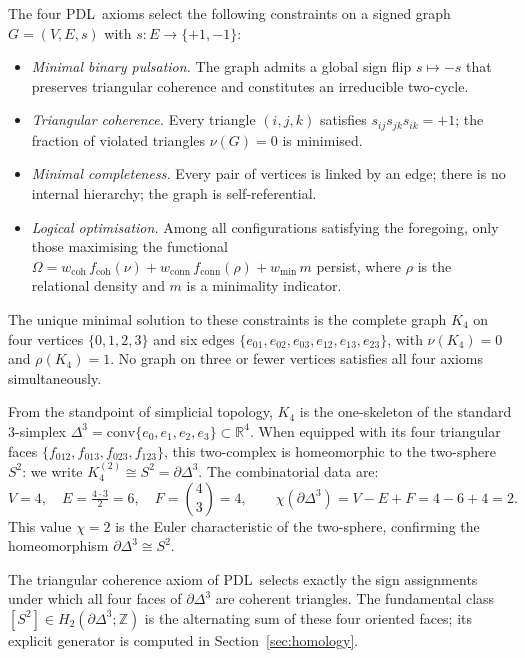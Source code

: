 \documentclass[11pt,a4paper]{article}
\theoremstyle{definition}
\newcommand{\PDL}{\textnormal{PDL}}
\newcommand{\Kfour}{K_4}
\newcommand{\Sfour}{\partial\Delta^3}
\newcommand{\Hk}[1]{H_{#1}}
\begin{document}
The four \PDL\ axioms select the following constraints on a signed graph $G = (V, E, s)$ with $s : E \to \{+1, -1\}$:\cite{PDL_Main_2026}
\begin{itemize}
  \item \emph{Minimal binary pulsation.} The graph admits a global sign flip $s \mapsto -s$ that preserves triangular coherence and constitutes an irreducible two-cycle.
  \item \emph{Triangular coherence.} Every triangle $(i,j,k)$ satisfies $s_{ij}s_{jk}s_{ik} = +1$; the fraction of violated triangles $\nu(G) = 0$ is minimised.
  \item \emph{Minimal completeness.} Every pair of vertices is linked by an edge; there is no internal hierarchy; the graph is self-referential.
  \item \emph{Logical optimisation.} Among all configurations satisfying the foregoing, only those maximising the functional $\Omega = w_{\mathrm{coh}}\,f_{\mathrm{coh}}(\nu) + w_{\mathrm{conn}}\,f_{\mathrm{conn}}(\rho) + w_{\min}\,m$ persist, where $\rho$ is the relational density and $m$ is a minimality indicator.
\end{itemize}
The unique minimal solution to these constraints is the complete graph $\Kfour$ on four vertices $\{0,1,2,3\}$ and six edges $\{e_{01}, e_{02}, e_{03}, e_{12}, e_{13}, e_{23}\}$, with $\nu(\Kfour) = 0$ and $\rho(\Kfour) = 1$.\cite{PDL_Main_2026} No graph on three or fewer vertices satisfies all four axioms simultaneously.

From the standpoint of simplicial topology, $\Kfour$ is the one-skeleton of the standard $3$-simplex $\Delta^3 = \mathrm{conv}\{e_0, e_1, e_2, e_3\} \subset \mathbb{R}^4$. When equipped with its four triangular faces $\{f_{012}, f_{013}, f_{023}, f_{123}\}$, this two-complex is homeomorphic to the two-sphere $S^2$: we write $\Kfour^{(2)} \cong S^2 = \Sfour$. The combinatorial data are:
\[
  V = 4, \quad E = \tfrac{4 \cdot 3}{2} = 6, \quad F = \binom{4}{3} = 4,
  \qquad \chi(\Sfour) = V - E + F = 4 - 6 + 4 = 2.
\]
This value $\chi = 2$ is the Euler characteristic of the two-sphere, confirming the homeomorphism $\Sfour \cong S^2$.

The triangular coherence axiom of \PDL\ selects exactly the sign assignments under which all four faces of $\Sfour$ are coherent triangles. The fundamental class $[S^2] \in \Hk{2}(\Sfour;\mathbb{Z})$ is the alternating sum of these four oriented faces; its explicit generator is computed in Section~\ref{sec:homology}.
\end{document}
